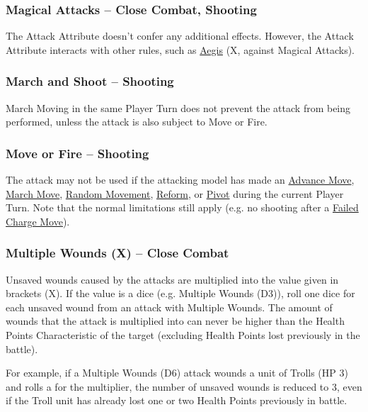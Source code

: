 \subsubsection{Magical Attacks -- Close Combat, Shooting}
\idx[main=y]{\magicalattacks}\label{magical_attacks}

The Attack Attribute doesn't confer any additional effects. However, the Attack Attribute interacts with other rules, such as \hyperref[aegis]{Aegis} (X, against Magical Attacks).

\subsubsection{March and Shoot -- Shooting}
\idx[main=y]{\marchandshoot}\label{march_and_shoot}

March Moving in the same Player Turn does not prevent the attack from being performed, unless the attack is also subject to Move or Fire.

\subsubsection{Move or Fire -- Shooting}
\idx[main=y]{\moveorfire}\label{move_or_fire}

The attack may not be used if the attacking model has made an \hyperref[advance_move]{Advance Move}, \hyperref[march_move]{March Move}, \hyperref[random_movement]{Random Movement}, \hyperref[reform]{Reform}, or \hyperref[pivots_and_wheels]{Pivot} during the current Player Turn. Note that the normal limitations still apply (e.g. no shooting after a \hyperref[failed_charge]{Failed Charge Move}).

\subsubsection{Multiple Wounds (X) -- Close Combat}
\idx[main=y]{\multiplewounds{}{}}\label{multiple_wounds}

Unsaved wounds caused by the attacks are multiplied into the value given in brackets (X). If the value is a dice (e.g. Multiple Wounds (D3)), roll one dice for each unsaved wound from an attack with Multiple Wounds. The amount of wounds that the attack is multiplied into can never be higher than the Health Points Characteristic of the target (excluding Health Points lost previously in the battle).

For example, if a Multiple Wounds (D6) attack wounds a unit of Trolls (HP 3) and rolls a  for the multiplier, the number of unsaved wounds is reduced to 3, even if the Troll unit has already lost one or two Health Points previously in battle.

